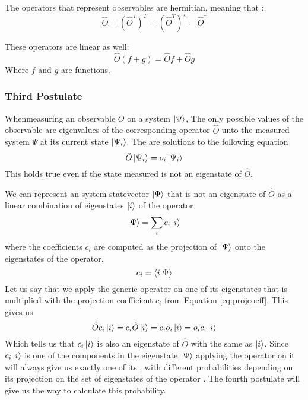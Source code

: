 \documentclass[../master_thesis.tex]{subfiles}
\begin{document}
The operators that represent observables are hermitian, meaning that
\cite{Cohen:1973}:
\begin{equation}
  \hat{O} = (\hat{O}^{\star})^T = (\hat{O}^T)^{\star} = \hat{O}^{\dagger}
\end{equation}

These operators are linear as well:
\begin{equation}
    \hat{O}(f + g) = \hat{O}f + \hat{O}g\label{eq:oplinearity}
\end{equation}
Where $f$ and $g$ are functions.

\subsubsection{Third Postulate}
Whenmeasuring an observable $O$ on a system $\ket{\Psi}$, The only possible
values of the observable are eigenvalues of the corresponding operator $\hat{O}$
unto the measured system $\Psi$ at its current state $\ket{\Psi_i}$. The \eivals
are solutions to the following equation \cite{Cohen:1973}
\begin{equation}
  \hat{O}\ket{\Psi_i} = o_i \ket{\Psi_i}
\end{equation}
This holds true even if the state measured is not an eigenstate of $\hat{O}$.

We can represent an system statevector $\ket{\Psi}$ that is not an eigenstate
of $\hat{O}$ as a linear combination of eigenstates $\ket{i}$ of the operator
\begin{equation}
  \ket{\Psi} = \sum_i c_i \ket{i}
\end{equation}
where the coefficients $c_i$ are computed as the projection of $\ket{\Psi}$ onto
the eigenstates of the operator.
\begin{equation}\label{eq:projcoeff}
  c_i = \braket{i|\Psi}
\end{equation}
Let us say that we apply the generic operator on one of its eigenstates that
is multiplied with the projection coefficient $c_i$ from Equation \ref{eq:projcoeff}.
This gives us
\begin{equation}
  \hat{O}c_i\ket{i} = c_i\hat{O}\ket{i} = c_i o_i\ket{i} = o_i c_i\ket{i}
\end{equation}
Which tells  us that $c_i\ket{i}$ is also an eigenstate of $\hat{O}$ with the
same \eival as $\ket{i}$. Since $c_i\ket{i}$ is one of the components in the
eigenstate $\ket{\Psi}$ applying the operator on it will always give us exactly
one of its \eivals, with different probabilities  depending on its projection on the set
of eigenstates of the operator \cite{Cohen:1973}. The fourth postulate will give
us the way to calculate this probability.
\end{document}
